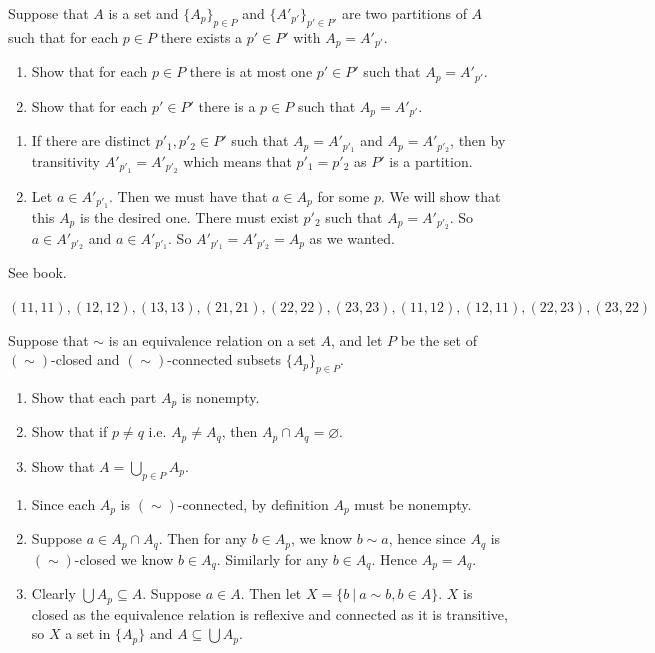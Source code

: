 Suppose that $A$ is a set and $\{A_p\}_{p\in P}$ and $\{A'_{p'}\}_{p'\in P'}$ are two partitions of $A$ such that for each $p\in P$ there exists a $p'\in P'$ with $A_p = A'_{p'}$.
\begin{enumerate}
    \item Show that for each $p\in P$ there is at most one $p'\in P'$ such that $A_p= A'_{p'}$.
    \item Show that for each $p'\in P'$ there is a $p\in P$ such that $A_p = A'_{p'}$.
\end{enumerate}

\solution
\begin{enumerate}
    \item If there are distinct $p'_1, p'_2\in P'$ such that $A_p=A'_{p'_1}$ and $A_p=A'_{p'_2}$, then by transitivity $A'_{p'_1}=A'_{p'_2}$ which means that $p'_1=p'_2$ as $P'$ is a partition.
    \item Let $a\in A'_{p'_1}$.  Then we must have that $a\in A_p$ for some $p$.  We will show that this $A_p$ is the desired one.  There must exist $p'_2$ such that $A_p=A'_{p'_2}$.   So $a \in A'_{p'_2}$ and $a\in A'_{p'_1}$.  So $A'_{p'_1} = A'_{p'_2} = A_p$ as we wanted.
\end{enumerate}

See book.

\solution
$(11, 11), (12, 12), (13,13), (21,21), (22,22), (23,23), (11, 12), (12, 11), (22, 23), (23,22)$

Suppose that $\sim$ is an equivalence relation on a set $A$, and let $P$ be the set of $(\sim)$-closed and $(\sim)$-connected subsets $\{A_p\}_{p\in P}$.
\begin{enumerate}
    \item Show that each part $A_p$ is nonempty.
    \item Show that if $p\neq q$ i.e. $A_p \neq A_q$, then $A_p\cap A_q = \varnothing$.
    \item Show that $A = \bigcup_{p\in P} A_p$.
\end{enumerate}

\solution
\begin{enumerate}
    \item Since each $A_p$ is $(\sim)$-connected, by definition $A_p$ must be nonempty.
    \item Suppose $a\in A_p \cap A_q$. Then for any $b\in A_p$, we know $b\sim a$, hence since $A_q$ is $(\sim)$-closed we know $b\in A_q$.  Similarly for any $b\in A_q$.  Hence $A_p = A_q$.
    \item Clearly $\bigcup A_p\subseteq A$.  Suppose $a\in A$.  Then let $X=\{b\ |\ a\sim b, b\in A\}$.  $X$ is closed as the equivalence relation is reflexive and connected as it is transitive, so $X$ a set in $\{A_p\}$ and $A\subseteq \bigcup A_p$.
\end{enumerate}

